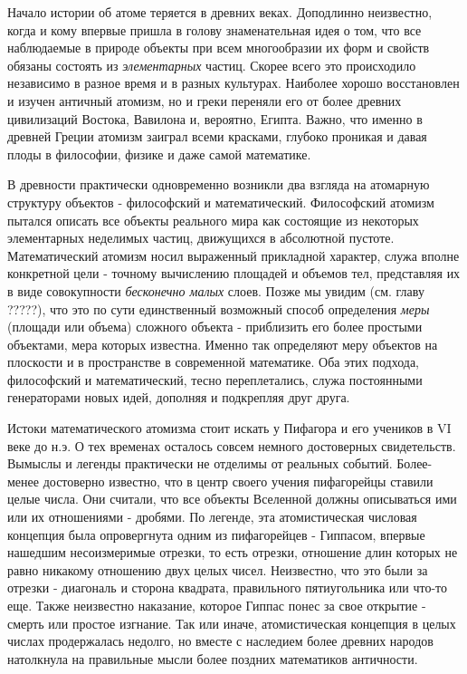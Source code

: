 Начало истории об атоме теряется в древних веках.
Доподлинно неизвестно, когда и кому впервые пришла в голову знаменательная идея о том, что все наблюдаемые в природе объекты при всем многообразии их форм и свойств обязаны состоять из \textit{элементарных} частиц.
Скорее всего это происходило независимо в разное время и в разных культурах.
Наиболее хорошо восстановлен и изучен античный атомизм, но и греки переняли его от более древних цивилизаций Востока, Вавилона и, вероятно, Египта.
Важно, что именно в древней Греции атомизм заиграл всеми красками, глубоко проникая и давая плоды в философии, физике и даже самой математике.

В древности практически одновременно возникли два взгляда на атомарную структуру объектов - философский и математический.
Философский атомизм пытался описать все объекты реального мира как состоящие из некоторых элементарных неделимых частиц, движущихся в абсолютной пустоте.
Математический атомизм носил выраженный прикладной характер, служа вполне конкретной цели - точному вычислению площадей и объемов тел, представляя их в виде совокупности \textit{бесконечно малых} слоев.
Позже мы увидим (см. главу ?????), что это по сути единственный возможный способ определения \textit{меры} (площади или объема) сложного объекта - приблизить его более простыми объектами, мера которых известна.
Именно так определяют меру объектов на плоскости и в пространстве в современной математике.
Оба этих подхода, философский и математический, тесно переплетались, служа постоянными генераторами новых идей, дополняя и подкрепляя друг друга.

Истоки математического атомизма стоит искать у Пифагора и его учеников в VI веке до н.э. 
О тех временах осталось совсем немного достоверных свидетельств.
Вымыслы и легенды практически не отделимы от реальных событий.
Более-менее достоверно известно, что в центр своего учения пифагорейцы ставили целые числа.
Они считали, что все объекты Вселенной должны описываться ими или их отношениями - дробями.
По легенде, эта атомистическая числовая концепция была опровергнута одним из пифагорейцев - Гиппасом, впервые нашедшим несоизмеримые отрезки, то есть отрезки, отношение длин которых не равно никакому отношению двух целых чисел.
Неизвестно, что это были за отрезки - диагональ и сторона квадрата, правильного пятиугольника или что-то еще.
Также неизвестно наказание, которое Гиппас понес за свое открытие - смерть или простое изгнание.   
Так или иначе, атомистическая концепция в целых числах продержалась недолго, но вместе с наследием более древних народов натолкнула на правильные мысли более поздних математиков античности.

